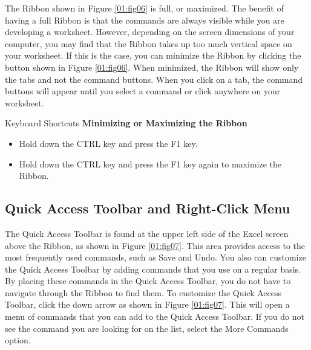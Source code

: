 The Ribbon shown in Figure \ref{01:fig06} is full, or maximized. The benefit of having a full Ribbon is that the commands are always visible while you are developing a worksheet. However, depending on the screen dimensions of your computer, you may find that the Ribbon takes up too much vertical space on your worksheet. If this is the case, you can minimize the Ribbon by clicking the button shown in Figure \ref{01:fig06}. When minimized, the Ribbon will show only the tabs and not the command buttons. When you click on a tab, the command buttons will appear until you select a command or click anywhere on your worksheet.

\begin{center}
	\begin{shtcutbox}{Keyboard Shortcuts}
		\textbf{Minimizing or Maximizing the Ribbon}
		\\
		\begin{itemize}
			\setlength{\itemsep}{0pt}
			\setlength{\parskip}{0pt}
			\setlength{\parsep}{0pt}
			
			\item Hold down the CTRL key and press the F1 key.
			\item Hold down the CTRL key and press the F1 key again to maximize the Ribbon.
			
		\end{itemize}
	\end{shtcutbox}
\end{center}

\subsection{Quick Access Toolbar and Right-Click Menu}

The Quick Access Toolbar is found at the upper left side of the Excel screen above the Ribbon, as shown in Figure \ref{01:fig07}. This area provides access to the most frequently used commands, such as Save and Undo. You also can customize the Quick Access Toolbar by adding commands that you use on a regular basis. By placing these commands in the Quick Access Toolbar, you do not have to navigate through the Ribbon to find them. To customize the Quick Access Toolbar, click the down arrow as shown in Figure \ref{01:fig07}. This will open a menu of commands that you can add to the Quick Access Toolbar. If you do not see the command you are looking for on the list, select the More Commands option.

